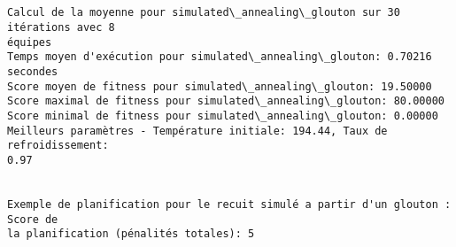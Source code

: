 \documentclass[11pt]{article}
\begin{document}
    \begin{Verbatim}[commandchars=\\\{\}]


Calcul de la moyenne pour simulated\_annealing\_glouton sur 30 itérations avec 8
équipes
Temps moyen d'exécution pour simulated\_annealing\_glouton: 0.70216 secondes
Score moyen de fitness pour simulated\_annealing\_glouton: 19.50000
Score maximal de fitness pour simulated\_annealing\_glouton: 80.00000
Score minimal de fitness pour simulated\_annealing\_glouton: 0.00000
Meilleurs paramètres - Température initiale: 194.44, Taux de refroidissement:
0.97


Exemple de planification pour le recuit simulé a partir d'un glouton : Score de
la planification (pénalités totales): 5
    \end{Verbatim}

    \begin{center}
    \end{center}
    { \hspace*{\fill} \\}
    
    \begin{center}
    \end{center}
    { \hspace*{\fill} \\}
    
\end{document}
